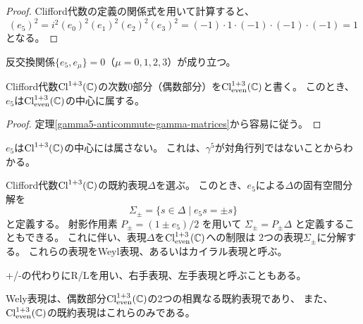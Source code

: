\begin{proof}
  Clifford代数の定義の関係式を用いて計算すると、
  \begin{equation}
    (e_5)^2=i^2(e_0)^2(e_1)^2(e_2)^2(e_3)^2
    =(-1)\cdot 1\cdot(-1)\cdot(-1)\cdot(-1)=1
  \end{equation}
  となる。
\end{proof}

\begin{thm}
  \label{gamma5-anticommute-gamma-matrices}
  反交換関係$\{e_5,e_\mu\}=0$（$\mu=0,1,2,3$）が成り立つ。
\end{thm}

\begin{thm}
  Clifford代数$\operatorname{Cl}^{1+3}(\mathbb{C})$の次数$0$部分（偶数部分）を$\operatorname{Cl}^{1+3}_{\mathrm{even}}(\mathbb{C})$と書く。
  このとき、$e_5$は$\operatorname{Cl}^{1+3}_{\mathrm{even}}(\mathbb{C})$の中心に属する。
\end{thm}

\begin{proof}
  定理\ref{gamma5-anticommute-gamma-matrices}から容易に従う。
\end{proof}

\begin{rem}
  $e_5$は$\operatorname{Cl}^{1+3}(\mathbb{C})$の中心には属さない。
  これは、$\gamma^5$が対角行列ではないことからわかる。
\end{rem}

\begin{dfn}
  Clifford代数$\operatorname{Cl}^{1+3}(\mathbb{C})$の既約表現$\Delta$を選ぶ。
  このとき、$e_5$による$\Delta$の固有空間分解を
  \begin{equation}
    \Sigma_{\pm}=\{ s \in \Delta \mid e_5 s = \pm s \}
  \end{equation}
  と定義する。
  射影作用素
  $P_{\pm}=(1\pm e_5)/2$
  を用いて
  $\Sigma_{\pm}=P_{\pm}\Delta$
  と定義することもできる。
  これに伴い、表現$\Delta$を$\operatorname{Cl}^{1+3}_{\mathrm{even}}(\mathbb{C})$への制限は
  $2$つの表現$\Sigma_{\pm}$に分解する。
  これらの表現をWeyl表現、あるいはカイラル表現と呼ぶ。
\end{dfn}

\begin{rem}
  +/-の代わりにR/Lを用い、右手表現、左手表現と呼ぶこともある。
\end{rem}

\begin{thm}
  Wely表現は、偶数部分$\operatorname{Cl}^{1+3}_{\mathrm{even}}(\mathbb{C})$の$2$つの相異なる既約表現であり、
  また、$\operatorname{Cl}^{1+3}_{\mathrm{even}}(\mathbb{C})$の既約表現はこれらのみである。
\end{thm}


